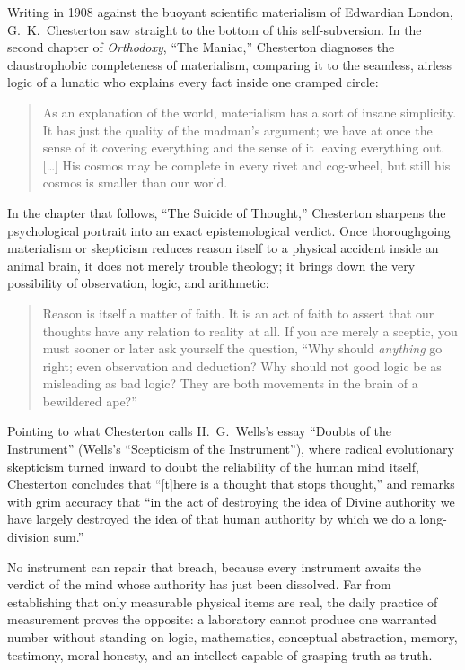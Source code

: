 Writing in 1908 against the buoyant scientific materialism of Edwardian London, G.\ K.\ Chesterton saw straight to the bottom of this self-subversion. In the second chapter of \emph{Orthodoxy}, ``The Maniac,'' Chesterton diagnoses the claustrophobic completeness of materialism, comparing it to the seamless, airless logic of a lunatic who explains every fact inside one cramped circle:

\begin{quote}
As an explanation of the world, materialism has a sort of insane simplicity. It has just the quality of the madman's argument; we have at once the sense of it covering everything and the sense of it leaving everything out. [\ldots] His cosmos may be complete in every rivet and cog-wheel, but still his cosmos is smaller than our world.
\end{quote}

In the chapter that follows, ``The Suicide of Thought,'' Chesterton sharpens the psychological portrait into an exact epistemological verdict. Once thoroughgoing materialism or skepticism reduces reason itself to a physical accident inside an animal brain, it does not merely trouble theology; it brings down the very possibility of observation, logic, and arithmetic:

\begin{quote}
Reason is itself a matter of faith. It is an act of faith to assert that our thoughts have any relation to reality at all. If you are merely a sceptic, you must sooner or later ask yourself the question, ``Why should \emph{anything} go right; even observation and deduction? Why should not good logic be as misleading as bad logic? They are both movements in the brain of a bewildered ape?''
\end{quote}

Pointing to what Chesterton calls H.\ G.\ Wells's essay ``Doubts of the Instrument'' (Wells's ``Scepticism of the Instrument''), where radical evolutionary skepticism turned inward to doubt the reliability of the human mind itself, Chesterton concludes that ``[t]here is a thought that stops thought,'' and remarks with grim accuracy that ``in the act of destroying the idea of Divine authority we have largely destroyed the idea of that human authority by which we do a long-division sum.''

No instrument can repair that breach, because every instrument awaits the verdict of the mind whose authority has just been dissolved. Far from establishing that only measurable physical items are real, the daily practice of measurement proves the opposite: a laboratory cannot produce one warranted number without standing on logic, mathematics, conceptual abstraction, memory, testimony, moral honesty, and an intellect capable of grasping truth as truth.
